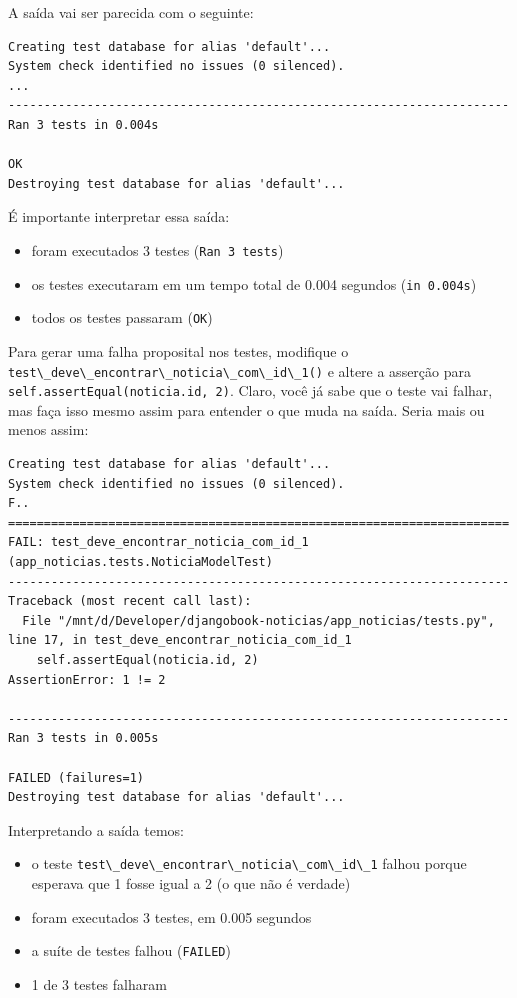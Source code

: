 \documentclass[brazil,a4paper,oneside,openright,parskip=full]{book}
\newcommand{\passthrough}[1]{#1}
\providecommand{\tightlist}{%
  \setlength{\itemsep}{0pt}\setlength{\parskip}{0pt}}
\begin{document}
A saída vai ser parecida com o seguinte:

\begin{lstlisting}[style=nonumber]
Creating test database for alias 'default'...
System check identified no issues (0 silenced).
...
----------------------------------------------------------------------
Ran 3 tests in 0.004s

OK
Destroying test database for alias 'default'...
\end{lstlisting}

É importante interpretar essa saída:

\begin{itemize}
\tightlist
\item
  foram executados 3 testes (\passthrough{\lstinline!Ran 3 tests!})
\item
  os testes executaram em um tempo total de 0.004 segundos
  (\passthrough{\lstinline!in 0.004s!})
\item
  todos os testes passaram (\passthrough{\lstinline!OK!})
\end{itemize}

Para gerar uma falha proposital nos testes, modifique o
\passthrough{\lstinline!test\_deve\_encontrar\_noticia\_com\_id\_1()!} e
altere a asserção para
\passthrough{\lstinline!self.assertEqual(noticia.id, 2)!}. Claro, você
já sabe que o teste vai falhar, mas faça isso mesmo assim para entender
o que muda na saída. Seria mais ou menos assim:

\begin{lstlisting}[style=nonumber]
Creating test database for alias 'default'...
System check identified no issues (0 silenced).
F..
======================================================================
FAIL: test_deve_encontrar_noticia_com_id_1 (app_noticias.tests.NoticiaModelTest)
----------------------------------------------------------------------
Traceback (most recent call last):
  File "/mnt/d/Developer/djangobook-noticias/app_noticias/tests.py", line 17, in test_deve_encontrar_noticia_com_id_1
    self.assertEqual(noticia.id, 2)
AssertionError: 1 != 2

----------------------------------------------------------------------
Ran 3 tests in 0.005s

FAILED (failures=1)
Destroying test database for alias 'default'...
\end{lstlisting}

Interpretando a saída temos:

\begin{itemize}
\tightlist
\item
  o teste
  \passthrough{\lstinline!test\_deve\_encontrar\_noticia\_com\_id\_1!}
  falhou porque esperava que 1 fosse igual a 2 (o que não é verdade)
\item
  foram executados 3 testes, em 0.005 segundos
\item
  a suíte de testes falhou (\passthrough{\lstinline!FAILED!})
\item
  1 de 3 testes falharam
\end{itemize}
\end{document}
